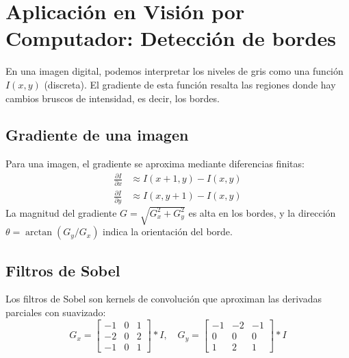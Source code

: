\documentclass[12pt,a4paper,openany,oneside]{book}
\begin{document}
\begin{center}
\end{center}

\section{Aplicación en Visión por Computador: Detección de bordes}

En una imagen digital, podemos interpretar los niveles de gris como una función $I(x, y)$ (discreta). El gradiente de esta función resalta las regiones donde hay cambios bruscos de intensidad, es decir, los bordes.

\subsection{Gradiente de una imagen}
Para una imagen, el gradiente se aproxima mediante diferencias finitas:
\begin{align*}
\frac{\partial I}{\partial x} &\approx I(x+1, y) - I(x, y) \\
\frac{\partial I}{\partial y} &\approx I(x, y+1) - I(x, y)
\end{align*}
La magnitud del gradiente $G = \sqrt{G_x^2 + G_y^2}$ es alta en los bordes, y la dirección $\theta = \arctan(G_y / G_x)$ indica la orientación del borde.

\subsection{Filtros de Sobel}
Los filtros de Sobel son kernels de convolución que aproximan las derivadas parciales con suavizado:
\[
G_x = \begin{bmatrix}
-1 & 0 & 1 \\
-2 & 0 & 2 \\
-1 & 0 & 1
\end{bmatrix} * I, \quad
G_y = \begin{bmatrix}
-1 & -2 & -1 \\
0 & 0 & 0 \\
1 & 2 & 1
\end{bmatrix} * I
\]
\end{document}
